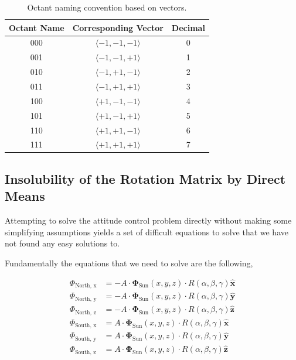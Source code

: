 \documentclass[10pt, letterpaper]{article}
\begin{document}
\begin{table}[H]
\centering
    \begin{tabular}{|c|c|c|}
    \hline
    Octant Name & Corresponding Vector & Decimal \\ \hline
    000 & $\langle -1,-1,-1 \rangle$ & 0 \\
    001 & $\langle -1,-1,+1 \rangle$ & 1 \\
    010 & $\langle -1,+1,-1 \rangle$ & 2 \\
    011 & $\langle -1,+1,+1 \rangle$ & 3 \\
    100 & $\langle +1,-1,-1 \rangle$ & 4 \\
    101 & $\langle +1,-1,+1 \rangle$ & 5 \\
    110 & $\langle +1,+1,-1 \rangle$ & 6 \\
    111 & $\langle +1,+1,+1 \rangle$ & 7 \\ \hline
    \end{tabular}
    \label{table:OctantNamingConvention}
    \caption{Octant naming convention based on vectors.}
\end{table}

\subsection{Insolubility of the Rotation Matrix by Direct Means}
Attempting to solve the attitude control problem directly without making some simplifying assumptions yields a set of difficult equations to solve that we have not found any easy solutions to.

Fundamentally the equations that we need to solve are the following,

\begin{align*}
    \Phi_{\text{North, x}} &= -A \cdot \mathbf{\Phi}_{\text{Sun}}(x, y, z) \cdot R(\alpha, \beta, \gamma) \mathbf{\hat{x}} \\
    \Phi_{\text{North, y}} &= -A \cdot \mathbf{\Phi}_{\text{Sun}}(x, y, z) \cdot R(\alpha, \beta, \gamma) \mathbf{\hat{y}} \\
    \Phi_{\text{North, z}} &= -A \cdot \mathbf{\Phi}_{\text{Sun}}(x, y, z) \cdot R(\alpha, \beta, \gamma) \mathbf{\hat{z}} \\
    \Phi_{\text{South, x}} &= A \cdot \mathbf{\Phi}_{\text{Sun}}(x, y, z) \cdot R(\alpha, \beta, \gamma) \mathbf{\hat{x}} \\
    \Phi_{\text{South, y}} &= A \cdot \mathbf{\Phi}_{\text{Sun}}(x, y, z) \cdot R(\alpha, \beta, \gamma) \mathbf{\hat{y}} \\
    \Phi_{\text{South, z}} &= A \cdot \mathbf{\Phi}_{\text{Sun}}(x, y, z) \cdot R(\alpha, \beta, \gamma) \mathbf{\hat{z}} \\
\end{align*}
\end{document}
